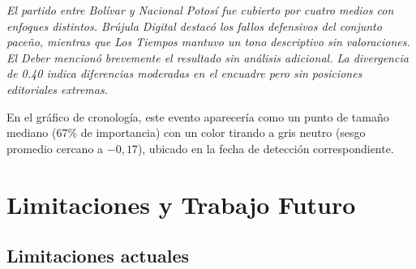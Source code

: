 \documentclass[12pt,a4paper]{article}
\begin{document}
\textit{El partido entre Bolívar y Nacional Potosí fue cubierto por cuatro medios con enfoques distintos. Brújula Digital destacó los fallos defensivos del conjunto paceño, mientras que Los Tiempos mantuvo un tono descriptivo sin valoraciones. El Deber mencionó brevemente el resultado sin análisis adicional. La divergencia de 0.40 indica diferencias moderadas en el encuadre pero sin posiciones editoriales extremas.}

En el gráfico de cronología, este evento aparecería como un punto de tamaño mediano (67\% de importancia) con un color tirando a gris neutro (sesgo promedio cercano a $-0{,}17$), ubicado en la fecha de detección correspondiente.

\section{Limitaciones y Trabajo Futuro}

\subsection*{Limitaciones actuales}
\end{document}
